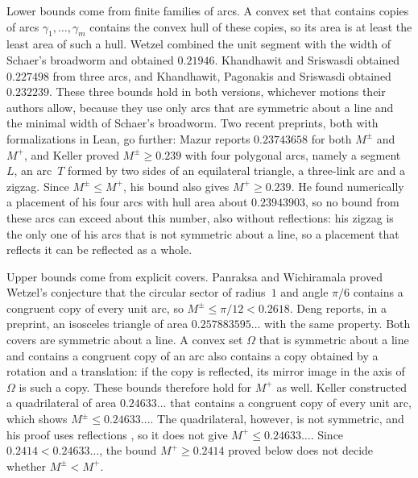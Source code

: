 \documentclass[11pt]{amsart}
\theoremstyle{definition}
\theoremstyle{remark}
\numberwithin{equation}{section}
\newcommand{\Mp}{M^{+}}
\newcommand{\Mpm}{M^{\pm}}
\newcommand{\KELLERFAM}{0.23943903}        %
\newcommand{\TAU}{0.2414}
\begin{document}
Lower bounds come from finite families of arcs. A convex set that contains copies of arcs $\gamma_1,\dots,\gamma_m$ contains the convex hull of these copies, so its area is at least the least area of such a hull. Wetzel \cite{Wet73} combined the unit segment with the width of Schaer's broadworm \cite{Sch68} and obtained $0.21946$. Khandhawit and Sriswasdi \cite{KS07} obtained $0.227498$ from three arcs, and Khandhawit, Pagonakis and Sriswasdi \cite{KPS13} obtained $0.232239$. These three bounds hold in both versions, whichever motions their authors allow, because they use only arcs that are symmetric about a line and the minimal width of Schaer's broadworm. Two recent preprints, both with formalizations in Lean, go further: Mazur \cite{Maz26} reports $0.23743658$ for both $\Mpm$ and $\Mp$, and Keller \cite{Kel26} proved $\Mpm\ge0.239$ with four polygonal arcs, namely a segment~$L$, an arc~$T$ formed by two sides of an equilateral triangle, a three-link arc and a zigzag. Since $\Mpm\le\Mp$, his bound also gives $\Mp\ge0.239$. He found numerically a placement of his four arcs with hull area about $\KELLERFAM$, so no bound from these arcs can exceed about this number, also without reflections: his zigzag is the only one of his arcs that is not symmetric about a line, so a placement that reflects it can be reflected as a whole.

Upper bounds come from explicit covers. Panraksa and Wichiramala \cite{PW21} proved Wetzel's conjecture that the circular sector of radius~$1$ and angle $\pi/6$ contains a congruent copy of every unit arc, so $\Mpm\le\pi/12<0.2618$. Deng \cite{Den26} reports, in a preprint, an isosceles triangle of area $0.257883595\ldots$ with the same property. Both covers are symmetric about a line. A convex set $\Omega$ that is symmetric about a line and contains a congruent copy of an arc also contains a copy obtained by a rotation and a translation: if the copy is reflected, its mirror image in the axis of $\Omega$ is such a copy. These bounds therefore hold for $\Mp$ as well. Keller \cite{Kel26} constructed a quadrilateral of area $0.24633\ldots$ that contains a congruent copy of every unit arc, which shows $\Mpm\le0.24633\ldots$. The quadrilateral, however, is not symmetric, and his proof uses reflections \cite[Section~4]{Kel26}, so it does not give $\Mp\le0.24633\ldots$. Since $\TAU<0.24633\ldots$, the bound $\Mp\ge\TAU$ proved below does not decide whether $\Mpm<\Mp$.
\end{document}
